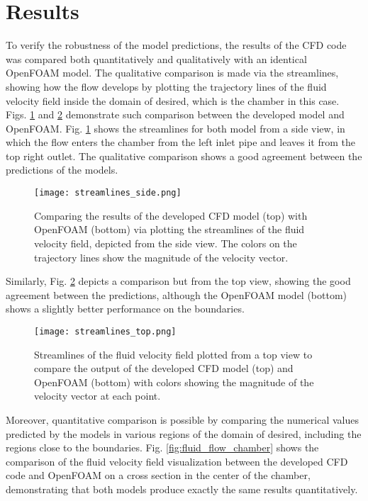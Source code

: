 \section{Results}

To verify the robustness of the model predictions, the results of the CFD code was compared both quantitatively and qualitatively with an identical  OpenFOAM model. The qualitative comparison is made via the streamlines, showing how the flow develops by plotting the trajectory lines of the fluid velocity field inside the domain of desired, which is the chamber in this case. Figs. \ref{fig:fluid_streamlines_side} and \ref{fig:fluid_streamlines_top} demonstrate such comparison between the developed model and OpenFOAM. Fig. \ref{fig:fluid_streamlines_side} shows the streamlines for both model from a side view, in which the flow enters the chamber from the left inlet pipe and leaves it from the top right outlet. The qualitative comparison shows a good agreement between the predictions of the models. 

\begin{figure}[h]
\centering
\medskip
\texttt{[image: streamlines\_side.png]}
\caption[Comparing streamline results of developed CFD code and OpenFOAM - side view]{Comparing the results of the developed CFD model (top) with OpenFOAM (bottom) via plotting the streamlines of the fluid velocity field, depicted from the  side view. The colors on the trajectory lines show the magnitude of the velocity vector.} \label{fig:fluid_streamlines_side}
\end{figure}

Similarly, Fig. \ref{fig:fluid_streamlines_top} depicts a comparison but from the top view, showing the good agreement between the predictions, although the OpenFOAM model (bottom) shows a slightly better performance on the boundaries.

\begin{figure}[h]
\centering
\medskip
\texttt{[image: streamlines\_top.png]}
\caption[Comparing streamline results of developed CFD code and OpenFOAM - top view]{Streamlines of the fluid velocity field plotted from a top view to compare the output of the developed CFD model (top) and OpenFOAM (bottom)  with colors showing the magnitude of the velocity vector at each point.} \label{fig:fluid_streamlines_top}
\end{figure}

Moreover, quantitative comparison is possible by comparing the numerical values predicted by the models in various regions of the domain of desired, including the regions close to the boundaries. Fig. \ref{fig:fluid_flow_chamber} shows the comparison of the fluid velocity field visualization between the developed CFD code and OpenFOAM on a cross section in the center of the chamber, demonstrating that both models produce exactly the same results quantitatively. 


